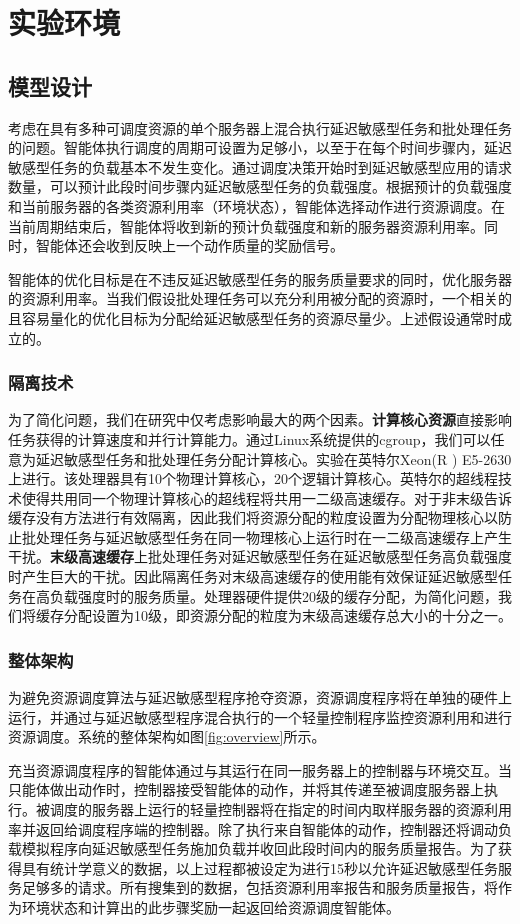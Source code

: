 \chapter{实验环境}
\section{模型设计}
考虑在具有多种可调度资源的单个服务器上混合执行延迟敏感型任务和批处理任务的问题。智能体执行调度的周期可设置为足够小，以至于在每个时间步骤内，延迟敏感型任务的负载基本不发生变化。通过调度决策开始时到延迟敏感型应用的请求数量，可以预计此段时间步骤内延迟敏感型任务的负载强度。根据预计的负载强度和当前服务器的各类资源利用率（环境状态），智能体选择动作进行资源调度。在当前周期结束后，智能体将收到新的预计负载强度和新的服务器资源利用率。同时，智能体还会收到反映上一个动作质量的奖励信号。

智能体的优化目标是在不违反延迟敏感型任务的服务质量要求的同时，优化服务器的资源利用率。当我们假设批处理任务可以充分利用被分配的资源时，一个相关的且容易量化的优化目标为分配给延迟敏感型任务的资源尽量少。上述假设通常时成立的。

\subsection{隔离技术}
为了简化问题，我们在研究中仅考虑影响最大的两个因素。\textbf{计算核心资源}直接影响任务获得的计算速度和并行计算能力。通过Linux系统提供的cgroup，我们可以任意为延迟敏感型任务和批处理任务分配计算核心。实验在英特尔Xeon(R
) E5-2630上进行。该处理器具有10个物理计算核心，20个逻辑计算核心。英特尔的超线程技术使得共用同一个物理计算核心的超线程将共用一二级高速缓存。对于非末级告诉缓存没有方法进行有效隔离，因此我们将资源分配的粒度设置为分配物理核心以防止批处理任务与延迟敏感型任务在同一物理核心上运行时在一二级高速缓存上产生干扰。\textbf{末级高速缓存}上批处理任务对延迟敏感型任务在延迟敏感型任务高负载强度时产生巨大的干扰。因此隔离任务对末级高速缓存的使用能有效保证延迟敏感型任务在高负载强度时的服务质量。处理器硬件提供20级的缓存分配，为简化问题，我们将缓存分配设置为10级，即资源分配的粒度为末级高速缓存总大小的十分之一。

\subsection{整体架构}
为避免资源调度算法与延迟敏感型程序抢夺资源，资源调度程序将在单独的硬件上运行，并通过与延迟敏感型程序混合执行的一个轻量控制程序监控资源利用和进行资源调度。系统的整体架构如图\ref{fig:overview}所示。

充当资源调度程序的智能体通过与其运行在同一服务器上的控制器与环境交互。当只能体做出动作时，控制器接受智能体的动作，并将其传递至被调度服务器上执行。被调度的服务器上运行的轻量控制器将在指定的时间内取样服务器的资源利用率并返回给调度程序端的控制器。除了执行来自智能体的动作，控制器还将调动负载模拟程序向延迟敏感型任务施加负载并收回此段时间内的服务质量报告。为了获得具有统计学意义的数据，以上过程都被设定为进行15秒以允许延迟敏感型任务服务足够多的请求。所有搜集到的数据，包括资源利用率报告和服务质量报告，将作为环境状态和计算出的此步骤奖励一起返回给资源调度智能体。

